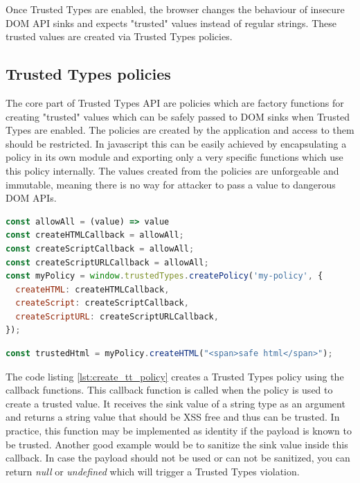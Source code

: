 Once Trusted Types are enabled, the browser changes the behaviour of insecure DOM API sinks and
expects "trusted" values instead of regular strings. These trusted values are created via Trusted
Types policies.

\subsection{Trusted Types policies}
\label{subsec:tt_policy}

The core part of Trusted Types API are policies which are factory functions for creating "trusted"
values which can be safely passed to DOM sinks when Trusted Types are enabled. The policies are
created by the application and access to them should be restricted. In javascript this can be easily
achieved by encapsulating a policy in its own module and exporting only a very specific functions
which use this policy internally. The values created from the policies are unforgeable and
immutable, meaning there is no way for attacker to pass a value to dangerous DOM APIs.

\bigskip
\begin{lstlisting}[language=JavaScript, caption=Creating a Trusted Types policy, label={lst:create_tt_policy}]
const allowAll = (value) => value
const createHTMLCallback = allowAll;
const createScriptCallback = allowAll;
const createScriptURLCallback = allowAll;
const myPolicy = window.trustedTypes.createPolicy('my-policy', {
  createHTML: createHTMLCallback,
  createScript: createScriptCallback,
  createScriptURL: createScriptURLCallback,
});
\end{lstlisting}

\bigskip
\begin{lstlisting}[language=JavaScript, caption=Create trusted value using a policy]
const trustedHtml = myPolicy.createHTML("<span>safe html</span>");
\end{lstlisting}

The code listing \ref{lst:create_tt_policy} creates a Trusted Types policy using the callback
functions. This callback function is called when the policy is used to create a trusted value. It
receives the sink value of a string type as an argument and returns a string value that should be
XSS free and thus can be trusted. In practice, this function may be implemented as identity if the
payload is known to be trusted. Another good example would be to sanitize the sink value inside this
callback. In case the payload should not be used or can not be sanitized, you can return
\emph{null} or \emph{undefined} which will trigger a Trusted Types violation.

